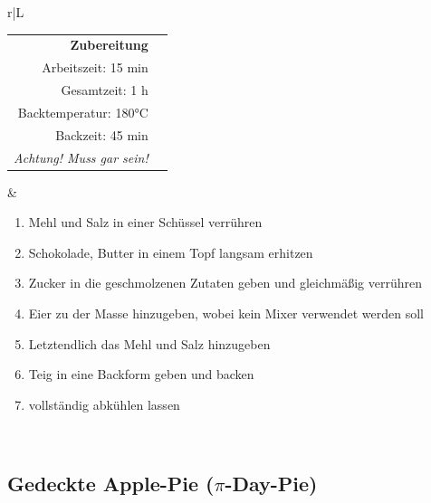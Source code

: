 \documentclass[a4paper, 12pt]{scrbook} 								%
\numberwithin{equation}{section} 									%
\begin{document}
									\begin{tabularx}{\textwidth}{r|L}
			
			\begin{tabular}[t]{rr}
				\textbf{Zubereitung}	\\
				Arbeitszeit: 15 min	\\
				Gesamtzeit:	1 h		\\
				Backtemperatur: 180°C	\\
				Backzeit: 45 min \\
				\emph{Achtung! Muss gar sein!}	\\
			\end{tabular}			&	\begin{enumerate}[]
											\item Mehl und Salz in einer Schüssel verrühren
											\item Schokolade, Butter in einem Topf langsam erhitzen
											\item Zucker in die geschmolzenen Zutaten geben und gleichmäßig verrühren
											\item Eier zu der Masse hinzugeben, wobei kein Mixer verwendet werden soll
											\item Letztendlich das Mehl und Salz hinzugeben
											\item Teig in eine Backform geben und backen
											\item vollständig abkühlen lassen
										\end{enumerate}	\\
		\end{tabularx}
		\newpage


		\subsection{Gedeckte Apple-Pie ($\pi$-Day-Pie)}
\end{document}
